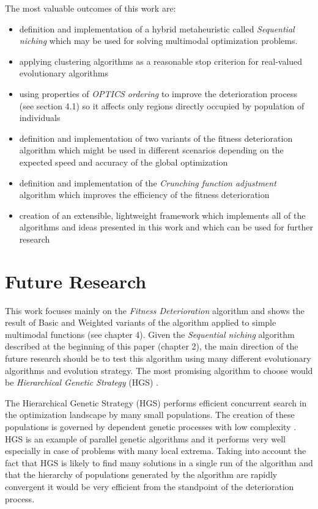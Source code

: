 The most valuable outcomes of this work are:
\begin{itemize}
  \item definition and implementation of a hybrid metaheuristic called \textit{Sequential
  niching} which may be used for solving multimodal optimization problems.
  \item applying clustering algorithms as a reasonable stop criterion for
  real-valued evolutionary algorithms
  \item using properties of \textit{OPTICS ordering} \cite{optics} to improve
  the deterioration process (see section 4.1) so it affects only regions
  directly occupied by population of individuals
  \item definition and implementation of two variants of the fitness
  deterioration algorithm which might be used in different scenarios depending
  on the expected speed and accuracy of the global optimization
  \item definition and implementation of the \textit{Crunching function
  adjustment} algorithm which improves the efficiency of the fitness
  deterioration
  \item creation of an extensible, lightweight framework which implements all of
  the algorithms and ideas presented in this work and which can be used for
  further research
\end{itemize}


\section{Future Research}

This work focuses mainly on the \textit{Fitness Deterioration} algorithm and
shows the result of Basic and Weighted variants of the algorithm applied to
simple multimodal functions (see chapter 4). Given the \textit{Sequential
niching} algorithm described at the beginning of this paper (chapter 2), the main
direction of the future research should be to test this algorithm using many 
different evolutionary algorithms and evolution strategy.
The most promising algorithm to choose would be \textit{Hierarchical Genetic
Strategy} (HGS) \cite{hgs}.

The Hierarchical Genetic Strategy (HGS) performs efficient concurrent
search in the optimization landscape by many small populations. The creation of
these populations is governed by dependent genetic processes with low complexity
\cite{hgs}. HGS is an example of parallel genetic algorithms and it performs
very well especially in case of problems with many local extrema.
Taking into account the fact that HGS is likely to find many solutions in a
single run of the algorithm and that the hierarchy of populations generated
by the algorithm are rapidly convergent it would be very efficient 
from the standpoint of the deterioration process.

